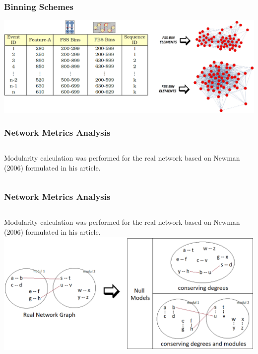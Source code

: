 \begin{frame}
	\frametitle{Binning Schemes}
	\includegraphics[width=\textwidth]{../tables/binning_schemes.png}
\end{frame}
\begin{frame}
	\frametitle{Network Metrics Analysis}
	\begin{columns}[c]
		Modularity calculation was performed for the real network based on Newman (2006) formulated in his article.
		\vspace{4cm}
	\end{columns}
\end{frame}
\begin{frame}
	\frametitle{Network Metrics Analysis}
	\begin{columns}[c]
		Modularity calculation was performed for the real network based on Newman (2006) formulated in his article.
		\includegraphics[width=\linewidth]{../tables/cartoon-null-model-definitions.png}
	\end{columns}
\end{frame}
